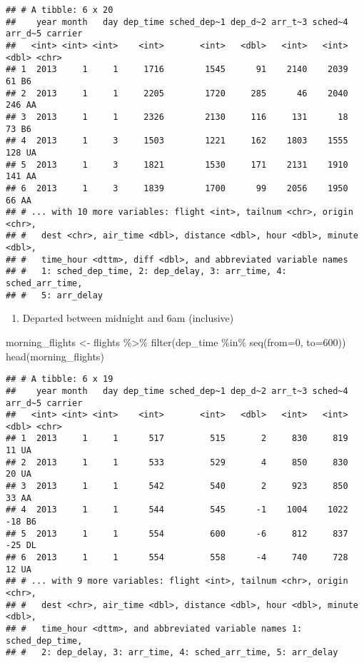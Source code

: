 \documentclass[
]{article}
\newenvironment{Shaded}{\begin{snugshade}}{\end{snugshade}}
\newcommand{\AttributeTok}[1]{\textcolor[rgb]{0.77,0.63,0.00}{#1}}
\newcommand{\DecValTok}[1]{\textcolor[rgb]{0.00,0.00,0.81}{#1}}
\newcommand{\FunctionTok}[1]{\textcolor[rgb]{0.00,0.00,0.00}{#1}}
\newcommand{\NormalTok}[1]{#1}
\newcommand{\OtherTok}[1]{\textcolor[rgb]{0.56,0.35,0.01}{#1}}
\newcommand{\SpecialCharTok}[1]{\textcolor[rgb]{0.00,0.00,0.00}{#1}}
\providecommand{\tightlist}{%
  \setlength{\itemsep}{0pt}\setlength{\parskip}{0pt}}
\begin{document}
\begin{verbatim}
## # A tibble: 6 x 20
##    year month   day dep_time sched_dep~1 dep_d~2 arr_t~3 sched~4 arr_d~5 carrier
##   <int> <int> <int>    <int>       <int>   <dbl>   <int>   <int>   <dbl> <chr>  
## 1  2013     1     1     1716        1545      91    2140    2039      61 B6     
## 2  2013     1     1     2205        1720     285      46    2040     246 AA     
## 3  2013     1     1     2326        2130     116     131      18      73 B6     
## 4  2013     1     3     1503        1221     162    1803    1555     128 UA     
## 5  2013     1     3     1821        1530     171    2131    1910     141 AA     
## 6  2013     1     3     1839        1700      99    2056    1950      66 AA     
## # ... with 10 more variables: flight <int>, tailnum <chr>, origin <chr>,
## #   dest <chr>, air_time <dbl>, distance <dbl>, hour <dbl>, minute <dbl>,
## #   time_hour <dttm>, diff <dbl>, and abbreviated variable names
## #   1: sched_dep_time, 2: dep_delay, 3: arr_time, 4: sched_arr_time,
## #   5: arr_delay
\end{verbatim}

\begin{enumerate}
\def\labelenumi{\alph{enumi})}
\setcounter{enumi}{6}
\tightlist
\item
  Departed between midnight and 6am (inclusive)
\end{enumerate}

\begin{Shaded}
\begin{Highlighting}[]
\NormalTok{morning\_flights }\OtherTok{\textless{}{-}}\NormalTok{ flights }\SpecialCharTok{\%\textgreater{}\%} \FunctionTok{filter}\NormalTok{(dep\_time }\SpecialCharTok{\%in\%} \FunctionTok{seq}\NormalTok{(}\AttributeTok{from=}\DecValTok{0}\NormalTok{, }\AttributeTok{to=}\DecValTok{600}\NormalTok{))}
\FunctionTok{head}\NormalTok{(morning\_flights)}
\end{Highlighting}
\end{Shaded}

\begin{verbatim}
## # A tibble: 6 x 19
##    year month   day dep_time sched_dep~1 dep_d~2 arr_t~3 sched~4 arr_d~5 carrier
##   <int> <int> <int>    <int>       <int>   <dbl>   <int>   <int>   <dbl> <chr>  
## 1  2013     1     1      517         515       2     830     819      11 UA     
## 2  2013     1     1      533         529       4     850     830      20 UA     
## 3  2013     1     1      542         540       2     923     850      33 AA     
## 4  2013     1     1      544         545      -1    1004    1022     -18 B6     
## 5  2013     1     1      554         600      -6     812     837     -25 DL     
## 6  2013     1     1      554         558      -4     740     728      12 UA     
## # ... with 9 more variables: flight <int>, tailnum <chr>, origin <chr>,
## #   dest <chr>, air_time <dbl>, distance <dbl>, hour <dbl>, minute <dbl>,
## #   time_hour <dttm>, and abbreviated variable names 1: sched_dep_time,
## #   2: dep_delay, 3: arr_time, 4: sched_arr_time, 5: arr_delay
\end{verbatim}
\end{document}
